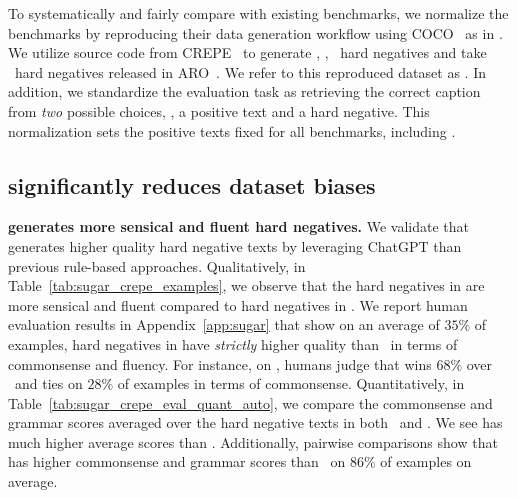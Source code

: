 To systematically and fairly compare \method with existing benchmarks, we normalize the benchmarks by reproducing their data generation workflow using COCO~\cite{lin2014microsoft} as in \method. We utilize source code from CREPE~\cite{ma2022crepe} to generate \replace, \swap, \negate\ hard negatives and take \shuffle\ hard negatives released in ARO~\cite{yuksekgonul2023when}. We refer to this reproduced dataset as \hncoco.
In addition, we standardize the evaluation task as retrieving the correct caption from \emph{two} possible choices, \ie, a positive text and a hard negative.
This normalization sets the positive texts fixed for all benchmarks, including \method.

\subsection{\method significantly reduces dataset biases}
\label{sec:exp-bias}




\textbf{\method generates more sensical and fluent hard negatives.}
We validate that \method generates higher quality hard negative texts by leveraging ChatGPT than previous rule-based approaches.
Qualitatively, in Table~\ref{tab:sugar_crepe_examples}, we observe that the hard negatives in \method are more sensical and fluent compared to hard negatives in \hncoco.
We report human evaluation results in Appendix~\ref{app:sugar} that show on an average of $35\%$ of examples, hard negatives in \method have \emph{strictly} higher quality than \hncoco\ in terms of commonsense and fluency. For instance, on \swap, humans judge that \method wins $68\%$ over \hncoco\ and ties on $28\%$ of examples in terms of commonsense.
Quantitatively, in Table~\ref{tab:sugar_crepe_eval_quant_auto}, we compare the commonsense and grammar scores averaged over the hard negative texts in both \hncoco\ and \method. We see \method has much higher average scores than \hncoco. Additionally, pairwise comparisons show that \method has higher commonsense and grammar scores than \hncoco\ on $86\%$ of examples on average.





